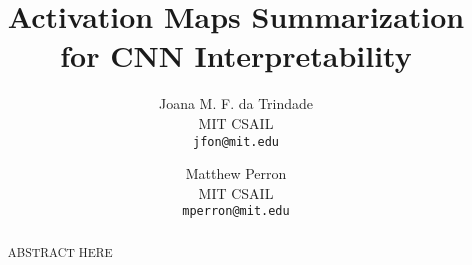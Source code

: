 \documentclass[10pt,twocolumn,letterpaper]{article}
\begin{document}
\title{Activation Maps Summarization for CNN Interpretability}

\author{Joana M. F. da Trindade\\
MIT CSAIL\\
{\tt\small jfon@mit.edu}
\and Matthew Perron\\
MIT CSAIL\\
{\tt\small mperron@mit.edu}
}

\maketitle

\begin{abstract}
ABSTRACT HERE
\end{abstract}







{\small


}
\end{document}
